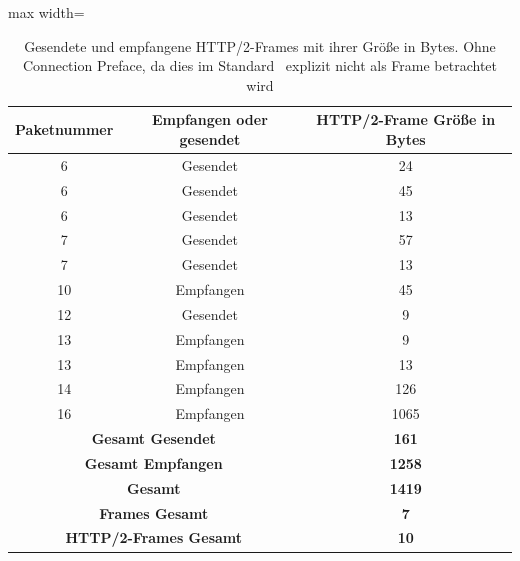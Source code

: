 \begin{table}
    \centering
    \begin{adjustbox}{max width=\textwidth}
        \begin{tabular}{|c|c|c|}
            \hline
            \textbf{Paketnummer} & \textbf{Empfangen oder gesendet} & \textbf{HTTP/2-Frame Größe in Bytes} \\
            \hline
            6 & Gesendet & 24 \\
            6 & Gesendet & 45 \\
            6 & Gesendet & 13 \\
            7 & Gesendet & 57 \\
            7 & Gesendet & 13 \\
            10 & Empfangen & 45 \\
            12 & Gesendet & 9 \\
            13 & Empfangen & 9 \\
            13 & Empfangen & 13 \\
            14 & Empfangen & 126 \\
            16 & Empfangen & 1065 \\
            \hline\hline
            \multicolumn{2}{|c|}{\textbf{Gesamt Gesendet}} & \textbf{161} \\
            \multicolumn{2}{|c|}{\textbf{Gesamt Empfangen}} & \textbf{1258} \\
            \multicolumn{2}{|c|}{\textbf{Gesamt}} & \textbf{1419} \\
            \multicolumn{2}{|c|}{\textbf{Frames Gesamt}} & \textbf{7} \\
            \multicolumn{2}{|c|}{\textbf{HTTP/2-Frames Gesamt}} & \textbf{10} \\
            \hline
        \end{tabular}
    \end{adjustbox}
    \caption{Gesendete und empfangene HTTP/2-Frames mit ihrer Größe in Bytes. Ohne Connection Preface, da dies im Standard~\cite{rfc9113_http2_headers} explizit nicht als Frame betrachtet wird}\label{tab:packet_size}
\end{table}

